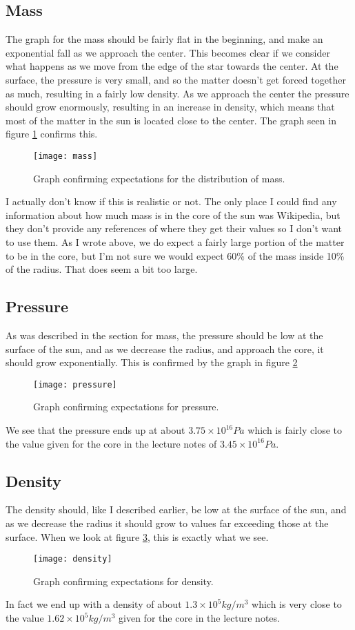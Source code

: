 \documentclass[a4paper,12pt]{article}
\begin{document}
\subsection{Mass}
The graph for the mass should be fairly flat in the beginning, and make an exponential fall as we approach the center. This becomes clear if we consider what happens as we move from the edge of the star towards the center. At the surface, the pressure is very small, and so the matter doesn't get forced together as much, resulting in a fairly low density. As we approach the center the pressure should grow enormously, resulting in an increase in density, which means that most of the matter in the sun is located close to the center.
The graph seen in figure \ref{fig:Mass} confirms this.
\begin{figure}[H]
	\texttt{[image: mass]}
	\caption{Graph confirming expectations for the distribution of mass.}
	\label{fig:Mass}
\end{figure}
I actually don't know if this is realistic or not. The only place I could find any information about how much mass is in the core of the sun was Wikipedia, but they don't provide any references of where they get their values so I don't want to use them.
As I wrote above, we do expect a fairly large portion of the matter to be in the core, but I'm not sure we would expect 60\% of the mass inside 10\% of the radius. That does seem a bit too large.
\subsection{Pressure}
As was described in the section for mass, the pressure should be low at the surface of the sun, and as we decrease the radius, and approach the core, it should grow exponentially. This is confirmed by the graph in figure \ref{fig:Pressure}
\begin{figure}[H]
	\texttt{[image: pressure]}
	\caption{Graph confirming expectations for pressure.}
	\label{fig:Pressure}
\end{figure}
We see that the pressure ends up at about $3.75\times10^{16} Pa$ which is fairly close to the value given for the core in the lecture notes of $3.45\times10^{16} Pa$.
\subsection{Density}
The density should, like I described earlier, be low at the surface of the sun, and as we decrease the radius it should grow to values far exceeding those at the surface. When we look at figure \ref{fig:Density}, this is exactly what we see. 
\begin{figure}[H]
	\texttt{[image: density]}
	\caption{Graph confirming expectations for density.}
	\label{fig:Density}
\end{figure}
In fact we end up with a density of about $1.3\times10^5 kg/m^3$ which is very close to the value $1.62\times10^5 kg/m^3$ given for the core in the lecture notes.
\end{document}
